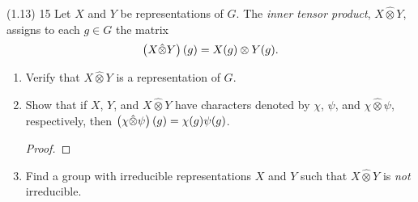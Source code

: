 \documentclass{../../math174}
\date{Wednesday March 6}
\author{}
\begin{document}
\begin{problemlist}
\item[(1.13) 15] Let \(X\) and \(Y\) be representations of \(G\).  The
  \emph{inner tensor product}, \(X \hat \otimes Y\), assigns to each
  \(g \in G\) the matrix
  \[
    \left( {X \hat \otimes Y} \right)(g) = X(g) \otimes Y(g).
  \]
  \begin{enumerate}
  \item Verify that \(X \hat \otimes Y\) is a representation of \(G\).

    \begin{solution}

    \end{solution}

  \item Show that if \(X\), \(Y\), and \(X \hat \otimes Y\) have
    characters denoted by \(\chi\), \(\psi\), and
    \(\chi \hat \otimes \psi\), respectively, then
    \(\left( {\chi \hat\otimes \psi} \right)(g) = \chi(g) \psi(g)\).

    \begin{solution}
      \begin{proof}

      \end{proof}
    \end{solution}

  \item Find a group with irreducible representations \(X\) and \(Y\)
    such that \(X \hat\otimes Y\) is \emph{not} irreducible.

    \begin{solution}

    \end{solution}
  \end{enumerate}
\end{problemlist}
\end{document}
